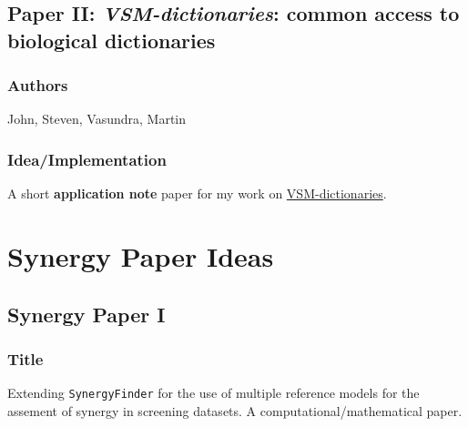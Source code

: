 \documentclass[
  12pt,
]{book}
\begin{document}
\hypertarget{paper-ii-vsm-dictionaries-common-access-to-biological-dictionaries}{%
\subsection*{\texorpdfstring{Paper II: \emph{VSM-dictionaries}: common access to biological dictionaries}{Paper II: VSM-dictionaries: common access to biological dictionaries}}\label{paper-ii-vsm-dictionaries-common-access-to-biological-dictionaries}}

\hypertarget{authors-1}{%
\subsubsection*{Authors}\label{authors-1}}

John, Steven, Vasundra, Martin

\hypertarget{ideaimplementation}{%
\subsubsection*{Idea/Implementation}\label{ideaimplementation}}

A short \textbf{application note} paper for my work on \protect\hyperlink{vsm-dict}{VSM-dictionaries}.

\hypertarget{synergy-paper-ideas}{%
\section{Synergy Paper Ideas}\label{synergy-paper-ideas}}

\hypertarget{synergy-paper-i}{%
\subsection*{Synergy Paper I}\label{synergy-paper-i}}

\hypertarget{title}{%
\subsubsection*{Title}\label{title}}

Extending \texttt{SynergyFinder} for the use of multiple reference models for the assement of synergy in screening datasets.
A computational/mathematical paper.
\end{document}
